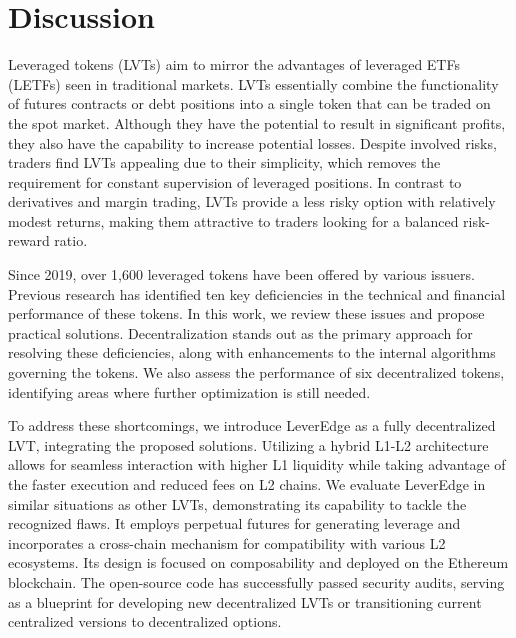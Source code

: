 \section{Discussion}
Leveraged tokens (LVTs) aim to mirror the advantages of leveraged ETFs (LETFs) seen in traditional markets. LVTs essentially combine the functionality of futures contracts or debt positions into a single token that can be traded on the spot market. Although they have the potential to result in significant profits, they also have the capability to increase potential losses. Despite involved risks, traders find LVTs appealing due to their simplicity, which removes the requirement for constant supervision of leveraged positions. In contrast to derivatives and margin trading, LVTs provide a less risky option with relatively modest returns, making them attractive to traders looking for a balanced risk-reward ratio.

Since 2019, over 1,600 leveraged tokens have been offered by various issuers. Previous research has identified ten key deficiencies in the technical and financial performance of these tokens. In this work, we review these issues and propose practical solutions. Decentralization stands out as the primary approach for resolving these deficiencies, along with enhancements to the internal algorithms governing the tokens. We also assess the performance of six decentralized tokens, identifying areas where further optimization is still needed.

To address these shortcomings, we introduce LeverEdge as a fully decentralized LVT, integrating the proposed solutions. Utilizing a hybrid L1-L2 architecture allows for seamless interaction with higher L1 liquidity while taking advantage of the faster execution and reduced fees on L2 chains. We evaluate LeverEdge in similar situations as other LVTs, demonstrating its capability to tackle the recognized flaws. It employs perpetual futures for generating leverage and incorporates a cross-chain mechanism for compatibility with various L2 ecosystems. Its design is focused on composability and deployed on the Ethereum blockchain. The open-source code has successfully passed security audits, serving as a blueprint for developing new decentralized LVTs or transitioning current centralized versions to decentralized options.

